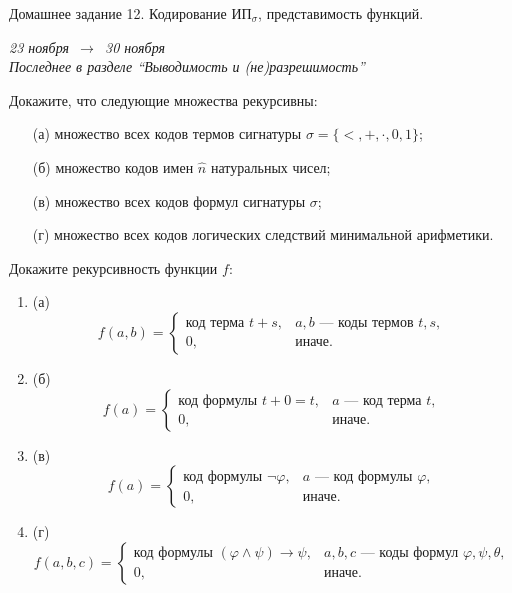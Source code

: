 \documentclass[a4paper,11pt]{article}
\begin{document}
   \newcommand{\enumsep}{\vspace{-2.8mm}
   		\begin{enumerate}[itemsep=0.4mm,leftmargin=2.5mm]}

\begin{center}
	{\Large Домашнее задание 12. Кодирование \(\text{ИП}_{\sigma}\), представимость функций.}

	{\it 23 ноября\ \(\to\)\ 30 ноября} \\
	{\it Последнее в разделе “Выводимость и (не)разрешимость”}
\end{center}


   \item Докажите, что следующие множества рекурсивны: \enumsep
	\item[(а)] множество всех кодов термов сигнатуры $\sigma=\{<,+,\cdot,0,1\}$; 
	\item[(б)] множество кодов имен $\widehat{n}$ натуральных чисел; 
	\item[(в)] множество всех кодов формул сигнатуры $\sigma$;
	\item[(г)] множество всех кодов логических следствий минимальной арифметики.
	   \end{enumerate}

   \item Докажите рекурсивность функции $f$: \enumsep
	\item[(а)] \[ f(a,b) = \begin{cases} \text{код терма }t+s,& a,b\text{ — коды термов }t,s, \\ 0,& \text{иначе.} \end{cases} \]
	\item[(б)] \[ f(a) = \begin{cases} \text{код формулы }t+0=t,& a\text{ — код терма }t, \\ 0,& \text{иначе.} \end{cases} \]
	\item[(в)] \[ f(a) = \begin{cases} \text{код формулы }\neg\varphi,& a\text{ — код формулы }\varphi, \\ 0,& \text{иначе.} \end{cases} \]
	\item[(г)] \[ f(a,b,c) = \begin{cases} \text{код формулы }(\varphi\land\psi)\to\psi,& a,b,c\text{ — коды формул }\varphi, \psi, \theta, \\ 0,& \text{иначе.} \end{cases} \] \end{enumerate}
\end{document}
